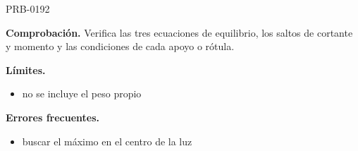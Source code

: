 \begin{studiumworked}{PRB-0192}
\par\textbf{Comprobación.} Verifica las tres ecuaciones de equilibrio, los saltos de cortante y momento y las condiciones de cada apoyo o rótula.

\textbf{Límites.}\begin{itemize}\item no se incluye el peso propio\end{itemize}

\textbf{Errores frecuentes.}\begin{itemize}\item buscar el máximo en el centro de la luz\end{itemize}

\end{studiumworked}

\Needspace{.3\textheight}

